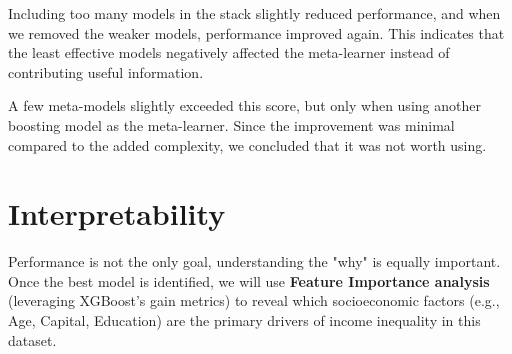 Including too many models in the stack slightly reduced performance, and when we removed the weaker models, performance improved again. This indicates that the least effective models negatively affected the meta-learner instead of contributing useful information.

A few meta-models slightly exceeded this score, but only when using another boosting model as the meta-learner. Since the improvement was minimal compared to the added complexity, we concluded that it was not worth using.

\section{Interpretability}
Performance is not the only goal, understanding the "why" is equally important. Once the best model is identified, we will use
\textbf{Feature Importance analysis} (leveraging XGBoost's gain metrics) to reveal which socioeconomic factors (e.g., Age, Capital, Education)
are the primary drivers of income inequality in this dataset.

